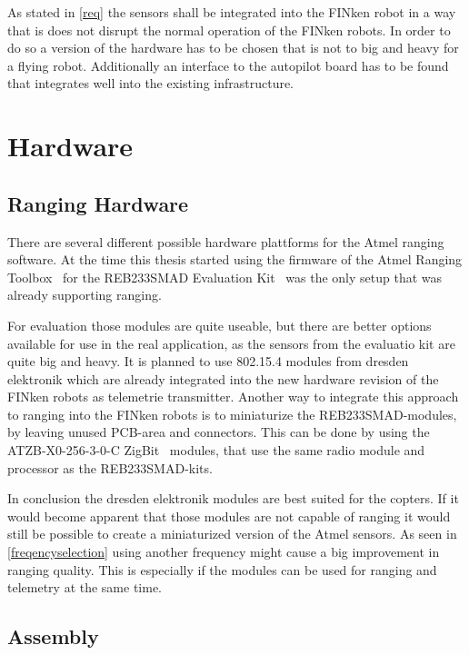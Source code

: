 
As stated in \autoref{req} the sensors shall be integrated into the FINken robot in a way that is does not disrupt the normal operation of the FINken robots.
In order to do so a version of the hardware has to be chosen that is not to big and heavy for a flying robot.
Additionally an interface to the autopilot board has to be found that integrates well into the existing infrastructure.

\section{Hardware}

\subsection{Ranging Hardware}

There are several different possible hardware plattforms for the Atmel ranging software.
At the time this thesis started using the firmware of the Atmel Ranging Toolbox~\cite{atmelrtb} for the REB233SMAD Evaluation Kit~\cite{REB233SMAD} was the only setup that was already supporting ranging.

For evaluation those modules are quite useable, but there are better options available for use in the real application, as the sensors from the evaluatio kit are quite big and heavy.
It is planned to use 802.15.4 modules from dresden elektronik which are already integrated into the new hardware revision of the FINken robots as telemetrie transmitter.
Another way to integrate this approach to ranging into the FINken robots is to miniaturize the REB233SMAD-modules, by leaving unused PCB-area and connectors.
This can be done by using the ATZB-X0-256-3-0-C ZigBit~\cite{atmelzigbit} modules, that use the same radio module and processor as the REB233SMAD-kits.

In conclusion the dresden elektronik modules are best suited for the copters.
If it would become apparent that those modules are not capable of ranging it would still be possible to create a miniaturized version of the Atmel sensors.
As seen in \autoref{freqencyselection} using another frequency might cause a big improvement in ranging quality.
This is especially if the modules can be used for ranging and telemetry at the same time.

\subsection{Assembly}

